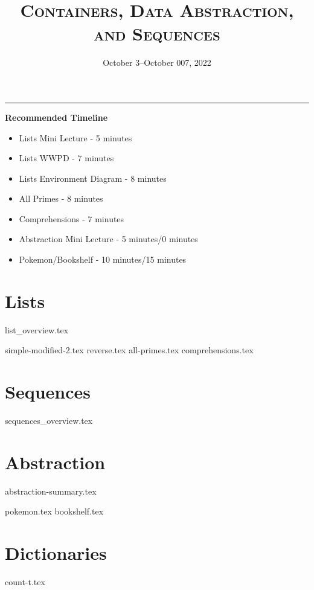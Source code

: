 \documentclass{exam}
\title{\textsc{Containers, Data Abstraction, \titlebreak and Sequences}}
\date{October 3--October 007, 2022}
\begin{document}
\maketitle
\rule{\textwidth}{0.15em}
\fontsize{12}{15}\selectfont


\begin{guide}
    \textbf{Recommended Timeline}
    \begin{itemize}
        \item Lists Mini Lecture - 5 minutes
        \item Lists WWPD - 7 minutes
        \item Lists Environment Diagram - 8 minutes
        \item All Primes - 8 minutes
        \item Comprehensions - 7 minutes
        \item Abstraction Mini Lecture - 5 minutes/0 minutes
        \item Pokemon/Bookshelf - 10 minutes/15 minutes
    \end{itemize}
\end{guide}

\section{Lists}
{list_overview.tex}
\begin{questions}
    {simple-modified-2.tex}
    {reverse.tex}
    \newpage %
    {all-primes.tex}
    {comprehensions.tex}
\end{questions}

\newpage
\section{Sequences}
{sequences_overview.tex}


\newpage
\section{Abstraction}
{abstraction-summary.tex}
\begin{questions}
    {pokemon.tex}
    {bookshelf.tex}
\end{questions}

\newpage
\section{Dictionaries}
\begin{questions}
    {count-t.tex}
\end{questions}
\end{document}
